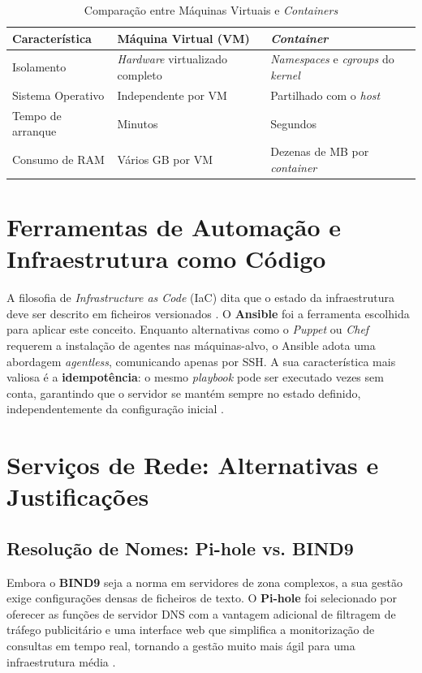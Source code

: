 \begin{table}[h!]
\centering
\caption{Comparação entre Máquinas Virtuais e \textit{Containers}}
\label{tab:vm_vs_container}
\begin{tabulary}{\textwidth}{|L|L|L|}
\hline
\textbf{Característica} & \textbf{Máquina Virtual (VM)} & \textbf{\textit{Container}} \\
\hline
Isolamento & \textit{Hardware} virtualizado completo & \textit{Namespaces} e \textit{cgroups} do \textit{kernel} \\
\hline
Sistema Operativo & Independente por VM & Partilhado com o \textit{host} \\
\hline
Tempo de arranque & Minutos & Segundos \\
\hline
Consumo de RAM & Vários GB por VM & Dezenas de MB por \textit{container} \\
\hline
\end{tabulary}
\end{table}

\section{Ferramentas de Automação e Infraestrutura como Código}

A filosofia de \textit{Infrastructure as Code} (IaC) dita que o estado da infraestrutura deve ser descrito em ficheiros versionados \cite{morris2016infrastructure}. O \textbf{Ansible} foi a ferramenta escolhida para aplicar este conceito. Enquanto alternativas como o \textit{Puppet} ou \textit{Chef} requerem a instalação de agentes nas máquinas-alvo, o Ansible adota uma abordagem \textit{agentless}, comunicando apenas por SSH. A sua característica mais valiosa é a \textbf{idempotência}: o mesmo \textit{playbook} pode ser executado vezes sem conta, garantindo que o servidor se mantém sempre no estado definido, independentemente da configuração inicial \cite{ansible_docs}.

\section{Serviços de Rede: Alternativas e Justificações}

\subsection{Resolução de Nomes: Pi-hole vs. BIND9}
Embora o \textbf{BIND9} seja a norma em servidores de zona complexos, a sua gestão exige configurações densas de ficheiros de texto. O \textbf{Pi-hole} foi selecionado por oferecer as funções de servidor DNS com a vantagem adicional de filtragem de tráfego publicitário e uma interface web que simplifica a monitorização de consultas em tempo real, tornando a gestão muito mais ágil para uma infraestrutura média \cite{pihole_docs}.

